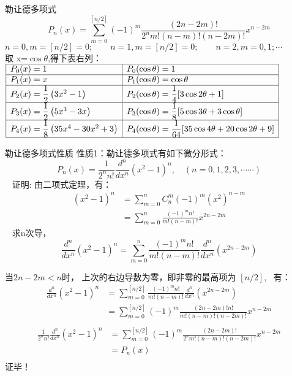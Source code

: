	{勒让德多项式}
	\[P_{n}(x)=\sum_{m=0}^{[n / 2]}(-1)^{m} \frac{(2 n-2 m) !}{2^{n} m !(n-m) !(n-2 m) !} x^{n-2 m}\]
	\[ n=0, m=[n/2]=0; \qquad n=1, m=[n/2]=0; \qquad n=2, m=0,1 ; \cdots \hspace{5em}\]
	取 x=$\cos\theta$,得下表右列：\\ \vspace{0.3em}
	{\small $\begin{array}{|l|l|}
		\hline P_{0}(x)=1 & P_{0}(\cos\theta)=1\\
		\hline P_{1}(x)=x & P_{1}(\cos \theta)=\cos \theta \\
		\hline P_{2}(x)=\dfrac{1}{2}\left(3 x^{2}-1\right) & P_{2}(\cos \theta)=\dfrac{1}{4}[3 \cos 2 \theta+1] \\ 
		\hline P_{3}(x)=\dfrac{1}{2}\left(5 x^{3}-3 x\right) & P_{3}(\cos \theta)=\dfrac{1}{8}[5 \cos 3 \theta+3 \cos \theta] \\
		\hline P_{4}(x)=\dfrac{1}{8}\left(35 x^{4}-30 x^{2}+3\right) & P_{4}(\cos \theta)=\dfrac{1}{64}[35 \cos 4 \theta+20 \cos 2 \theta+9] \\
		\hline
	\end{array}$}
	 


	{勒让德多项式性质}
	{\alert{性质1}}：勒让德多项式有如下微分形式：
	\begin{equation*}
		P_{n}(x)=\frac{1}{2^{n} n !} \frac{d^{n}}{d x^{n}}\left(x^{2}-1\right)^{n}, \quad(n=0,1,2,3, \cdots \cdots)
	\end{equation*}	 
	{\alert{证明:}} 由二项式定理，有：
	\begin{align*}
		\left(x^{2}-1\right)^{n}&=\sum_{m=0}^{n} C_{n}^{m}(-1)^{m}\left(x^{2}\right)^{n-m}\\
		&=\sum_{m=0}^{n} \frac{(-1)^{m} n !}{m !(n-m) !} x^{2 n-2 m}
	\end{align*}	 
	求n次导，
	\begin{equation*}
		\frac{d^{n}}{d x^{n}}\left(x^{2}-1\right)^{n}=\sum_{m=0}^{n} \frac{(-1)^{m} n !}{m !(n-m) !} \frac{d^{n}}{d x^{n}}\left(x^{2 n-2 m}\right)
	\end{equation*}	
	


	当$2n-2m<n$时， 上次的右边导数为零，即非零的最高项为 $[n/2]$,  有：
	\begin{align*}
		\frac{d^{n}}{d x^{n}}\left(x^{2}-1\right)^{n}&=\sum_{m=0}^{[n/2]} \frac{(-1)^{m} n !}{m !(n-m) !} \frac{d^{n}}{d x^{n}}\left(x^{2 n-2 m}\right)\\
		&=\sum_{m=0}^{[n / 2]}(-1)^{m} \frac{(2 n-2 m) ! n!}{ m !(n-m) !(n-2 m) !} x^{n-2 m}\\
	\end{align*}	
	\begin{align*}
		\frac{1}{2^{n} n !} \frac{d^{n}}{d x^{n}}\left(x^{2}-1\right)^{n} &= \sum_{m=0}^{[n / 2]}(-1)^{m} \frac{(2 n-2 m) !}{2^{n} m !(n-m) !(n-2 m) !} x^{n-2 m}\\
		&=P_n(x)\\
	\end{align*}	
	{\alert{证毕！}}
	


